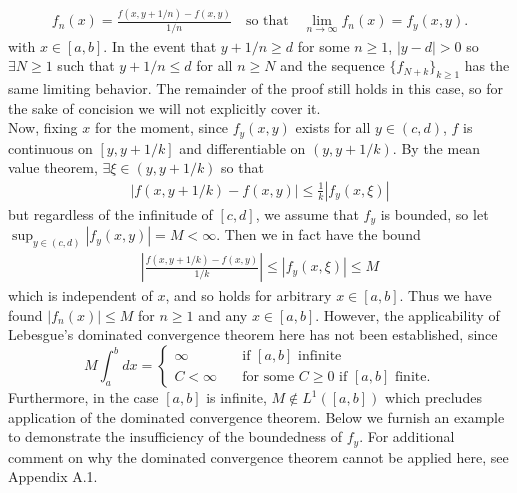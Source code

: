 \documentclass[11pt, letterpaper]{article}
\begin{document}
    \begin{align*}
        f_n(x)=\frac{f(x,y+1/n)-f(x,y)}{1/n}\quad\text{so that}\quad\lim_{n\rightarrow\infty}f_n(x)=f_y(x,y).\tag{7}
    \end{align*}
    with $x\in[a,b]$. In the event that $y+1/n\geq d$ for some $n\geq 1$, $|y-d|>0$ so $\exists N\geq 1$ such that $y+1/n\leq d$ for all $n\geq N$ and the sequence $\{f_{N+k}\}_{k\geq 1}$ 
    has the same limiting behavior. The remainder of the proof still holds in this case, so for the sake of concision we will not explicitly cover it.\\[10pt]
    Now, fixing $x$ for the moment, since $f_y(x,y)$ exists for all $y\in(c,d)$, $f$ is continuous on $[y,y+1/k]$ and differentiable on $(y,y+1/k)$. By the mean value theorem, $\exists\xi\in(y,y+1/k)$ so that
    \begin{align*}
        |f(x,y+1/k)-f(x,y)|\leq\frac{1}{k}|f_y(x,\xi)|
    \end{align*}
    but regardless of the infinitude of $[c,d]$, we assume that $f_y$ is bounded, so let $\sup_{y\in(c,d)}|f_y(x,y)|=M<\infty$. Then we in fact have the bound
    \begin{align*}
        \left|\frac{f(x,y+1/k)-f(x,y)}{1/k}\right|\leq |f_y(x,\xi)|\leq M\tag{8}
    \end{align*}
    which is independent of $x$, and so holds for arbitrary $x\in[a,b]$. Thus we have found $|f_n(x)|\leq M$ for  $n\geq 1$ and any $x\in[a,b]$.
    However, the applicability of Lebesgue's dominated convergence theorem here has not been established, since
    \[M\int_a^bdx=\begin{cases}
        \infty\quad&\text{if $[a,b]$ infinite}\\
        C<\infty\quad&\text{for some $C\geq 0$ if $[a,b]$ finite.}
    \end{cases}\]
    Furthermore, in the case $[a,b]$ is infinite, $M\notin L^1([a,b])$ which precludes application of the dominated convergence theorem. Below we furnish an example to demonstrate the insufficiency of the boundedness of $f_y$. For additional comment
    on why the dominated convergence theorem cannot be applied here, see Appendix A.1. 
\end{document}
